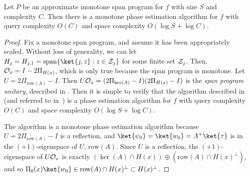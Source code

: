 \documentclass{toc}
\begin{document}
\begin{lemma}\label{lem:monotone-span-to-alg}
Let $P$ be an approximate monotone span program for $f$ with size $S$ and complexity $C$. Then there is a monotone phase estimation algorithm for $f$ with query complexity $O(C)$ and space complexity $O(\log S+\log C)$. 
\end{lemma}
\begin{proof}
Fix a monotone span program, and assume it has been appropriately scaled. Without loss of generality, we can let $H_j=H_{j,1}=\mathrm{span}\{\ket{j,z}:z\in {\cal Z}_j\}$ for some finite set ${\cal Z}_j$.  Then, ${\cal O}_x=I-2\Pi_{H(x)}$, which is only true because the span program is monotone. 
Let $U=2\Pi_{\mathrm{row}(A)}-I$. Then $U{\cal O}_x = (2\Pi_{\ker(A)}-I)(2\Pi_{H(x)}-I)$ is the \emph{span program unitary}, described in . Then it is simple to verify that the algorithm described in \cite[Lemma 3.6]{IJ15} (and referred to in~) is a phase estimation algorithm for $f$ with query complexity $O(C)$ and space complexity $O(\log S+\log C)$.

The algorithm is a monotone phase estimation algorithm because $U=2\Pi_{\mathrm{row}(A)}-I$ is a reflection, and $\ket{\psi_0}=\ket{w_0}=A^+\ket{\tau}$ is in the $(+1)$-eigenspace of $U$, $\mathrm{row}(A)$. Since $U$ is a reflection, the $(+1)$-eigenspace of $U{\cal O}_x$ is exactly $(\ker(A)\cap H(x))\oplus (\mathrm{row}(A)\cap H(x)^\bot)$, and so $\Pi_0(x)\ket{w_0}\in\mathrm{row}(A)\cap H(x)^\bot\subset H(x)^\bot$.
\end{proof}
\end{document}
